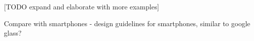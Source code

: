 
[TODO expand and elaborate with more examples]

Compare with smartphones - design guidelines for smartphones, similar to google glass?

